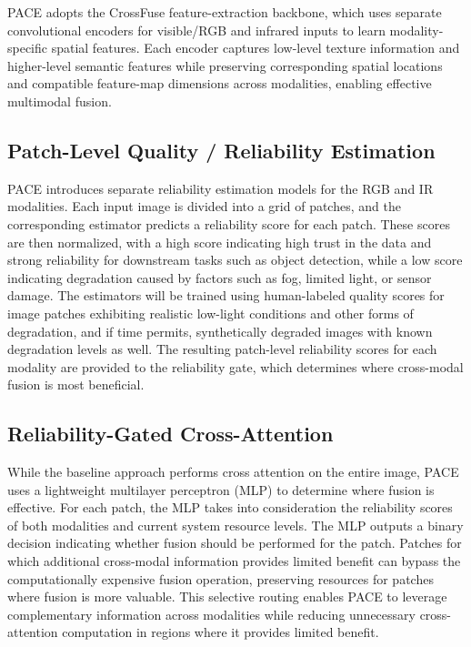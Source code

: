 \documentclass[conference]{IEEEtran}
\begin{document}
PACE adopts the CrossFuse feature-extraction backbone, which uses separate convolutional encoders for visible/RGB and infrared inputs to learn modality-specific spatial features. Each encoder captures low-level texture information and higher-level semantic features while preserving corresponding spatial locations and compatible feature-map dimensions across modalities, enabling effective multimodal fusion.

\subsection{Patch-Level Quality / Reliability Estimation}

PACE introduces separate reliability estimation models for the RGB and IR modalities. Each input image is divided into a grid of patches, and the corresponding estimator predicts a reliability score for each patch. These scores are then normalized, with a high score indicating high trust in the data and strong reliability for downstream tasks such as object detection, while a low score indicating degradation caused by factors such as fog, limited light, or sensor damage. The estimators will be trained using human-labeled quality scores for image patches exhibiting realistic low-light conditions and other forms of degradation, and if time permits, synthetically degraded images with known degradation levels as well. The resulting patch-level reliability scores for each modality are provided to the reliability gate, which determines where cross-modal fusion is most beneficial.

\subsection{Reliability-Gated Cross-Attention}

While the baseline approach performs cross attention on the entire image, PACE uses a lightweight multilayer perceptron (MLP) to determine where fusion is effective. For each patch, the MLP takes into consideration the reliability scores of both modalities and current system resource levels. The MLP outputs a binary decision indicating whether fusion should be performed for the patch. Patches for which additional cross-modal information provides limited benefit can bypass the computationally expensive fusion operation, preserving resources for patches where fusion is more valuable. This selective routing enables PACE to leverage complementary information across modalities while reducing unnecessary cross-attention computation in regions where it provides limited benefit.
\end{document}
